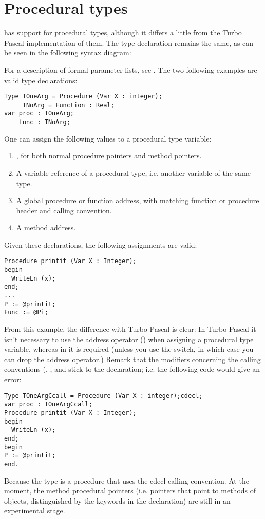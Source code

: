 \documentclass{report}
\begin{document}
\section{Procedural types}
\fpc has support for procedural types, although it differs a little from
the Turbo Pascal implementation of them. The type declaration remains the
same, as can be seen in the following syntax diagram:

For a description of formal parameter lists, see .
The two following examples are valid type declarations:
\begin{verbatim}
Type TOneArg = Procedure (Var X : integer);
     TNoArg = Function : Real;
var proc : TOneArg;
    func : TNoArg;
\end{verbatim}
One can assign the following values to a procedural type variable:
\begin{enumerate}
\item {}, for both normal procedure pointers and method pointers.
\item A variable reference of a procedural type, i.e. another variable of
the same type.
\item A global procedure or function address, with matching function or
procedure header and calling convention.
\item A method address.
\end{enumerate}
Given these declarations, the following assignments are valid:
\begin{verbatim}
Procedure printit (Var X : Integer);
begin
  WriteLn (x);
end;
...
P := @printit;
Func := @Pi;
\end{verbatim}
From this example, the difference with Turbo Pascal is clear: In Turbo
Pascal it isn't necessary to use the address operator ()
when assigning a procedural type variable, whereas in \fpc it is required
(unless you use the  switch, in which case you can drop the address
operator.)
Remark that the modifiers concerning the calling conventions (,
,  and  stick to the declaration;
i.e. the following code would give an error:
\begin{verbatim}
Type TOneArgCcall = Procedure (Var X : integer);cdecl;
var proc : TOneArgCcall;
Procedure printit (Var X : Integer);
begin
  WriteLn (x);
end;
begin
P := @printit;
end.
\end{verbatim}
Because the  type is a procedure that uses the cdecl
calling convention.
At the moment, the method procedural pointers (i.e. pointers that point to
methods of objects, distinguished by the  keywords in the
declaration) are still in an experimental stage.
\end{document}
